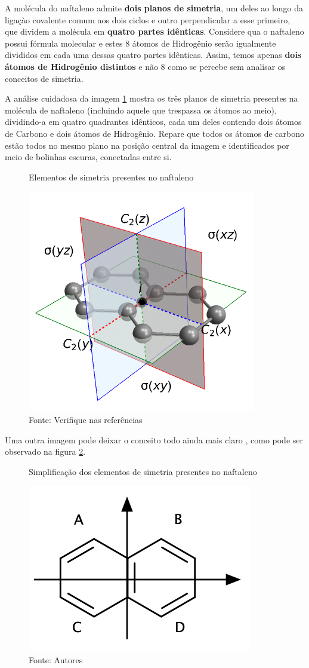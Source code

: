 A molécula do naftaleno admite \textbf{dois planos de simetria}, um deles ao longo da ligaçào covalente comum aos dois ciclos e outro perpendicular a esse primeiro, que dividem a molécula em \textbf{quatro partes idênticas}. Considere qua o naftaleno possui fórmula molecular  e estes 8 átomos de Hidrogênio serão igualmente divididos em cada uma dessas quatro partes idênticas. Assim, temos apenas \textbf{dois átomos de Hidrogênio distintos} e não 8 como se percebe sem analisar os conceitos de simetria.

A análise cuidadosa da imagem \ref{fig:simetria} mostra os três planos de simetria presentes na molécula de naftaleno (incluindo aquele que trespassa os átomos ao meio), dividindo-a em quatro quadrantes idênticos, cada um deles contendo dois átomos de Carbono e dois átomos de Hidrogênio. Repare que todos os átomos de carbono estão todos no mesmo plano na posição central da imagem e identificados por meio de bolinhas escuras, conectadas entre si.

\begin{figure}[h]
	\centering
	\vspace{0.5cm}
	\caption{Elementos de simetria presentes no naftaleno}
	\includegraphics[width=0.5\linewidth]{imagens/simetria.png}
	\caption*{Fonte: Verifique nas referências}
	\label{fig:simetria}
\end{figure}

Uma outra imagem pode deixar o conceito todo ainda mais claro \cite{sym13040526}, como pode ser observado na figura \ref{fig:simetria2}.

\begin{figure}[h]
	\centering
	\vspace{0.5cm}
	\caption{Simplificação dos elementos de simetria presentes no naftaleno}
	\includegraphics[width=0.35\linewidth]{imagens/simetria3.png}
	\caption*{Fonte: Autores}
	\label{fig:simetria2}
\end{figure}

